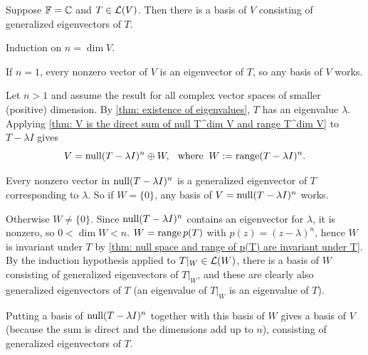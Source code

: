 \begin{thm}
  \label{thm: a basis of generalized eigenvectors}
  Suppose $\mathbb{F} = \mathbb{C}$ and $T \in \mathcal{L}(V)$. Then there is a basis of $V$ consisting of generalized eigenvectors of $T$.
\end{thm}
\begin{prf}
  Induction on $n = \dim V$.

   If $n = 1$, every nonzero vector of $V$ is an eigenvector of $T$, so any basis of $V$ works.

   Let $n > 1$ and assume the result for all complex vector spaces of smaller (positive) dimension. By \ref{thm: existence of eigenvalues}, $T$ has an eigenvalue $\lambda$. Applying \ref{thm: V is the direct sum of null T^dim V and range T^dim V} to $T - \lambda I$ gives
  \begin{equation}
    V = \operatorname{null} (T - \lambda I)^n \oplus W, \;\;\, \text{where}\;\; W := \operatorname{range} (T - \lambda I)^n.
  \end{equation}

  Every nonzero vector in $\operatorname{null} (T - \lambda I)^n$ is a generalized eigenvector of $T$ corresponding to $\lambda$. So if $W = \{0\}$, any basis of $V = \operatorname{null} (T - \lambda I)^n$ works.

  Otherwise $W \neq \{0\}$. Since $\operatorname{null} (T - \lambda I)^n$ contains an eigenvector for $\lambda$, it is nonzero, so $0 < \dim W < n$. $W = \operatorname{range} p(T)$ with $p(z) = (z - \lambda)^n$, hence $W$ is invariant under $T$ by \ref{thm: null space and range of p(T) are invariant under T}. By the induction hypothesis applied to $T|_W \in \mathcal{L}(W)$, there is a basis of $W$ consisting of generalized eigenvectors of $T|_W$, and these are clearly also generalized eigenvectors of $T$ (an eigenvalue of $T|_W$ is an eigenvalue of $T$).

  Putting a basis of $\operatorname{null} (T - \lambda I)^n$ together with this basis of $W$ gives a basis of $V$ (because the sum is direct and the dimensions add up to $n$), consisting of generalized eigenvectors of $T$.
\end{prf}


